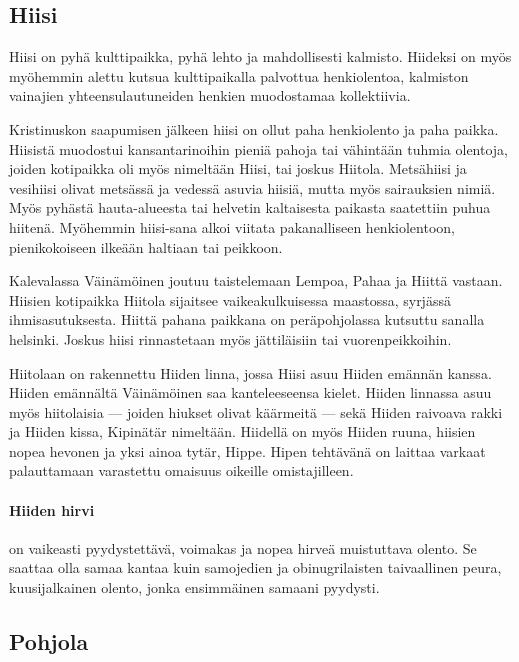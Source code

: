 \subsection{Hiisi}

  Hiisi on pyhä kulttipaikka, pyhä lehto ja mahdollisesti kalmisto. Hiideksi on myös myöhemmin
  alettu kutsua kulttipaikalla palvottua henkiolentoa, kalmiston vainajien yhteensulautuneiden
  henkien muodostamaa kollektiivia. \par
  Kristinuskon saapumisen jälkeen hiisi on ollut paha henkiolento ja paha paikka. Hiisistä
  muodostui kansantarinoihin pieniä pahoja tai vähintään tuhmia olentoja, joiden kotipaikka oli
  myös nimeltään Hiisi, tai joskus Hiitola. Metsähiisi ja vesihiisi olivat metsässä ja vedessä
  asuvia hiisiä, mutta myös sairauksien nimiä. Myös pyhästä hauta-alueesta tai helvetin kaltaisesta
  paikasta saatettiin puhua hiitenä. Myöhemmin hiisi-sana alkoi viitata pakanalliseen
  henkiolentoon, pienikokoiseen ilkeään haltiaan tai peikkoon. \par
  Kalevalassa Väinämöinen joutuu taistelemaan Lempoa, Pahaa ja Hiittä vastaan. Hiisien kotipaikka
  Hiitola sijaitsee vaikeakulkuisessa maastossa, syrjässä ihmisasutuksesta. Hiittä pahana paikkana
  on peräpohjolassa kutsuttu sanalla helsinki. Joskus hiisi rinnastetaan myös jättiläisiin tai
  vuorenpeikkoihin. \par
  Hiitolaan on rakennettu Hiiden linna, jossa Hiisi asuu Hiiden emännän kanssa. Hiiden emännältä
  Väinämöinen saa kanteleeseensa kielet. Hiiden linnassa asuu myös hiitolaisia --- joiden hiukset
  olivat käärmeitä --- sekä Hiiden raivoava rakki ja Hiiden kissa, Kipinätär nimeltään. Hiidellä
  on myös Hiiden ruuna, hiisien nopea hevonen ja yksi ainoa tytär, Hippe. Hipen tehtävänä on
  laittaa varkaat palauttamaan varastettu omaisuus oikeille omistajilleen. 

  \paragraph{Hiiden hirvi} on vaikeasti pyydystettävä, voimakas ja nopea hirveä muistuttava olento.
    Se saattaa olla samaa kantaa kuin samojedien ja obinugrilaisten taivaallinen peura,
    kuusijalkainen olento, jonka ensimmäinen samaani pyydysti. 


\subsection{Pohjola}

